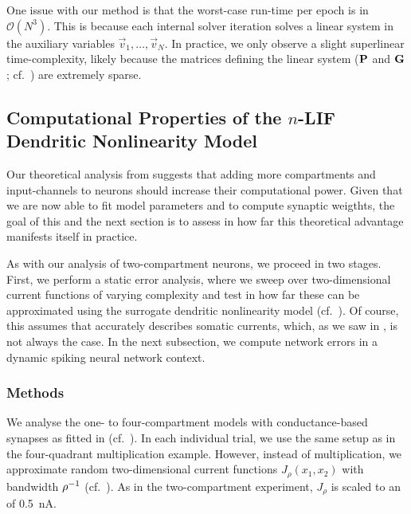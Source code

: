 One issue with our \SQP method is that the worst-case run-time per epoch is in $\mathcal{O}(N^3)$.
This is because each internal \QP solver iteration solves a linear system in the auxiliary variables $\vec v_1, \ldots, \vec v_N$.
In practice, we only observe a slight superlinear time-complexity, likely because the matrices defining the linear system ($\mathbf{P}$ and $\mathbf{G}$; cf.~) are extremely sparse.

\subsection{Computational Properties of the $n$-LIF Dendritic Nonlinearity Model}
\label{sec:nlif_experiment_2}

Our theoretical analysis from  suggests that adding more compartments and input-channels to \nlif neurons should increase their computational power.
Given that we are now able to fit \nlif model parameters and to compute synaptic weigthts, the goal of this and the next section is to assess in how far this theoretical advantage manifests itself in practice.

As with our analysis of two-compartment neurons, we proceed in two stages.
First, we perform a static error analysis, where we sweep over two-dimensional current functions of varying complexity and test in how far these can be approximated using the surrogate dendritic nonlinearity model \Hden (cf.~).
Of course, this assumes that \Hden accurately describes somatic currents, which, as we saw in , is not always the case.
In the next subsection, we compute network errors in a dynamic spiking neural network context.

\subsubsection{Methods}
We analyse the one- to four-compartment models with conductance-based synapses as fitted in  (cf.~).
In each individual trial, we use the same setup as in the four-quadrant multiplication example.
However, instead of multiplication, we approximate random two-dimensional current functions $J_\rho(x_1, x_2)$ with bandwidth ${\rho^{-1}}$ (cf.~).
As in the two-compartment experiment, $J_\rho$ is scaled to an \RMS of \SI{0.5}{\nano\ampere}.

